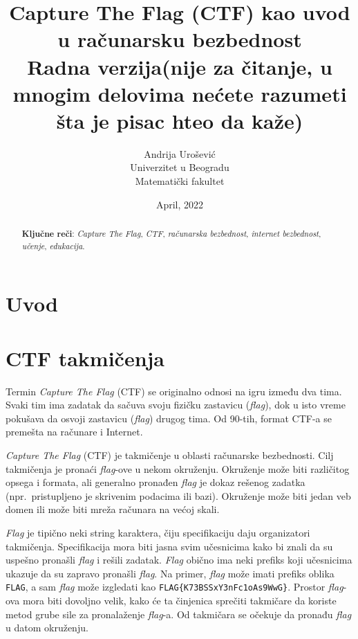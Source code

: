 \documentclass[12pt, a4paper, twocolumn]{article}
\title{Capture The Flag (CTF) kao uvod u računarsku bezbednost\\Radna verzija(nije za čitanje, u mnogim delovima nećete razumeti šta je pisac hteo da kaže)\\}
\author{Andrija Urošević\\Univerzitet u Beogradu\\Matematički fakultet}
\date{April, 2022}
\begin{document}
\maketitle

\begin{abstract}
    \textbf{Ključne reči}: \emph{Capture The Flag}, \emph{CTF}, 
    \emph{računarska bezbednost}, \emph{internet bezbednost}, \emph{učenje}, 
    \emph{edukacija}.
\end{abstract}

\section{Uvod}

\section{CTF takmičenja}

Termin \emph{Capture The Flag} (CTF) se originalno odnosi na igru između dva
tima. Svaki tim ima zadatak da sačuva svoju fizičku zastavicu (\emph{flag}), 
dok u isto vreme pokušava da osvoji zastavicu (\emph{flag}) drugog tima.
Od 90-tih, format CTF-a se premešta na računare i Internet. 

\emph{Capture The Flag} (CTF) je takmičenje u oblasti računarske bezbednosti.
Cilj takmičenja je pronaći \emph{flag}-ove u nekom okruženju. Okruženje može
biti različitog opsega i formata, ali generalno pronađen \emph{flag} je dokaz
rešenog zadatka (npr.\ pristupljeno je skrivenim podacima ili bazi). Okruženje 
može  biti jedan veb domen ili može biti mreža računara na većoj skali.

\emph{Flag} je tipično neki string karaktera, čiju specifikaciju daju
organizatori takmičenja. Specifikacija mora biti jasna svim učesnicima kako 
bi znali da su uspešno pronašli \emph{flag} i rešili zadatak. \emph{Flag}
obično ima neki prefiks koji učesnicima ukazuje da su zapravo pronašli 
\emph{flag}. Na primer, \emph{flag} može imati prefiks oblika \texttt{FLAG},
a sam \emph{flag} može izgledati kao \texttt{FLAG\{K73BSSxY3nFc1oAs9WwG\}}.
Prostor \emph{flag}-ova mora biti dovoljno velik, kako će ta činjenica 
sprečiti takmičare da koriste metod grube sile za pronalaženje \emph{flag}-a. 
Od takmičara se očekuje da pronađu \emph{flag} u datom okruženju.
\end{document}
